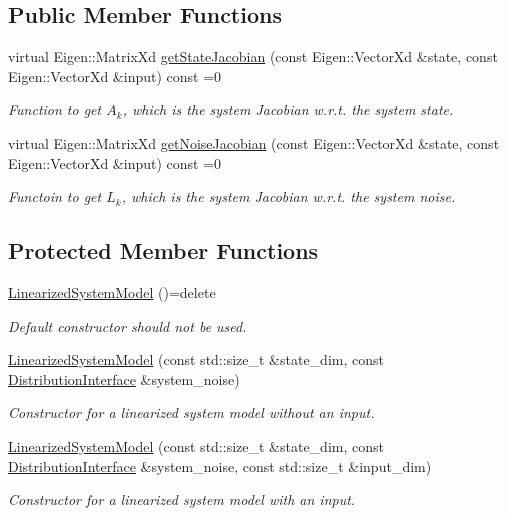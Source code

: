 \subsection*{Public Member Functions}
\begin{DoxyCompactItemize}
\item 
virtual Eigen\+::\+Matrix\+Xd \hyperlink{classrefill_1_1LinearizedSystemModel_a4a0bd58431d96f37cf52494fcbcd2d07}{get\+State\+Jacobian} (const Eigen\+::\+Vector\+Xd \&state, const Eigen\+::\+Vector\+Xd \&input) const =0
\begin{DoxyCompactList}\small\item\em Function to get $ A_k $, which is the system Jacobian w.\+r.\+t. the system state. \end{DoxyCompactList}\item 
virtual Eigen\+::\+Matrix\+Xd \hyperlink{classrefill_1_1LinearizedSystemModel_a2fdc435d8e47f27ad167ff31827a1c48}{get\+Noise\+Jacobian} (const Eigen\+::\+Vector\+Xd \&state, const Eigen\+::\+Vector\+Xd \&input) const =0
\begin{DoxyCompactList}\small\item\em Functoin to get $ L_k $, which is the system Jacobian w.\+r.\+t. the system noise. \end{DoxyCompactList}\end{DoxyCompactItemize}
\subsection*{Protected Member Functions}
\begin{DoxyCompactItemize}
\item 
\hyperlink{classrefill_1_1LinearizedSystemModel_aa0c5e6dea98f7d287b8b2928a42d91fe}{Linearized\+System\+Model} ()=delete
\begin{DoxyCompactList}\small\item\em Default constructor should not be used. \end{DoxyCompactList}\item 
\hyperlink{classrefill_1_1LinearizedSystemModel_a0181615604602290af776b97ed5a9200}{Linearized\+System\+Model} (const std\+::size\+\_\+t \&state\+\_\+dim, const \hyperlink{classrefill_1_1DistributionInterface}{Distribution\+Interface} \&system\+\_\+noise)
\begin{DoxyCompactList}\small\item\em Constructor for a linearized system model without an input. \end{DoxyCompactList}\item 
\hyperlink{classrefill_1_1LinearizedSystemModel_ae8b8577bdbd47e09e076580627415358}{Linearized\+System\+Model} (const std\+::size\+\_\+t \&state\+\_\+dim, const \hyperlink{classrefill_1_1DistributionInterface}{Distribution\+Interface} \&system\+\_\+noise, const std\+::size\+\_\+t \&input\+\_\+dim)
\begin{DoxyCompactList}\small\item\em Constructor for a linearized system model with an input. \end{DoxyCompactList}\end{DoxyCompactItemize}


